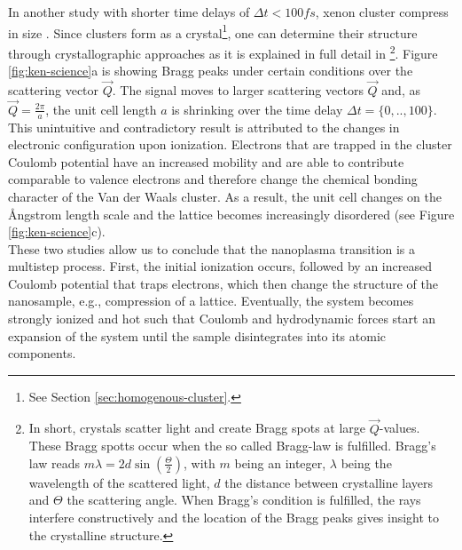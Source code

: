 In another study with shorter time delays of $\Delta t<100 fs$, xenon cluster compress in size \citep{Ferguson-2016-SciAdv}. Since clusters form as a crystal\footnote{See Section \ref{sec:homogenous-cluster}.}, one can determine their structure through crystallographic approaches as it is explained in full detail in \citep[][chapter 5]{Als-Nielson-2011-JWS}\footnote{In short, crystals scatter light and create Bragg spots at large $\vec{Q}$-values. These Bragg spotts occur when the so called Bragg-law is fulfilled. Bragg's law reads $m \lambda = 2d \sin\left(\frac{\Theta}{2}\right)$, with $m$ being an integer, $\lambda$ being the wavelength of the scattered light, $d$ the distance between crystalline layers and $\Theta$ the scattering angle. When Bragg's condition is fulfilled, the rays interfere constructively and the location of the Bragg peaks gives insight to the crystalline structure.}. Figure \ref{fig:ken-science}a is showing Bragg peaks under certain conditions over the scattering vector $\vec{Q}$. The signal moves to larger scattering vectors $\vec{Q}$ and, as $\vec{Q}=\frac{2\pi}{a}$, the unit cell length $a$ is shrinking over the time delay $\Delta t = \{0,..,100\}$. This unintuitive and contradictory result is attributed to the changes in electronic configuration upon ionization. Electrons that are trapped in the cluster Coulomb potential have an increased mobility and are able to contribute comparable to valence electrons and therefore change the chemical bonding character of the Van der Waals cluster. As a result, the unit cell changes on the {\AA}ngstrom length scale and the lattice becomes increasingly disordered (see Figure \ref{fig:ken-science}c).\\
These two studies allow us to conclude that the nanoplasma transition is a multistep process. First, the initial ionization occurs, followed by an increased Coulomb potential that traps electrons, which then change the structure of the nanosample, e.g., compression of a lattice. Eventually, the system becomes strongly ionized and hot such that Coulomb and hydrodynamic forces start an expansion of the system until the sample disintegrates into its atomic components.
%
%
%
